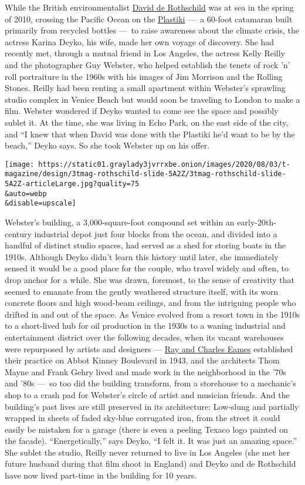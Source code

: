 While the British environmentalist
\href{https://tmagazine.blogs.nytimes3xbfgragh.onion/2010/03/24/profile-in-style-david-de-rothschild/}{David
de Rothschild} was at sea in the spring of 2010, crossing the Pacific
Ocean on the \href{https://theplastiki.com/}{Plastiki} ---~a 60-foot
catamaran built primarily from recycled bottles ---~to raise awareness
about the climate crisis, the actress Karina Deyko, his wife, made her
own voyage of discovery. She had recently met, through a mutual friend
in Los Angeles, the actress Kelly Reilly and the photographer Guy
Webster, who helped establish the tenets of rock 'n' roll portraiture in
the 1960s with his images of Jim Morrison and the Rolling Stones. Reilly
had been renting a small apartment within Webster's sprawling studio
complex in Venice Beach but would soon be traveling to London to make a
film. Webster wondered if Deyko wanted to come see the space and
possibly sublet it. At the time, she was living in Echo Park, on the
east side of the city, and ``I knew that when David was done with the
Plastiki he'd want to be by the beach,'' Deyko says. So she took Webster
up on his offer.

\texttt{[image: https://static01.graylady3jvrrxbe.onion/images/2020/08/03/t-magazine/design/3tmag-rothschild-slide-5A2Z/3tmag-rothschild-slide-5A2Z-articleLarge.jpg?quality=75\\\&auto=webp\\\&disable=upscale]}

Webster's building, a 3,000-square-foot compound set within an
early-20th-century industrial depot just four blocks from the ocean, and
divided into a handful of distinct studio spaces, had served as a shed
for storing boats in the 1910s. Although Deyko didn't learn this history
until later, she immediately sensed it would be a good place for the
couple, who travel widely and often, to drop anchor for a while. She was
drawn, foremost, to the sense of creativity that seemed to emanate from
the gently weathered structure itself, with its worn concrete floors and
high wood-beam ceilings, and from the intriguing people who drifted in
and out of the space. As Venice evolved from a resort town in the 1910s
to a short-lived hub for oil production in the 1930s to a waning
industrial and entertainment district over the following decades, when
its vacant warehouses were repurposed by artists and designers ---
\href{https://www.nytimes3xbfgragh.onion/2020/05/15/arts/ray-charles-eames-artists.html}{Ray
and Charles Eames} established their practice on Abbot Kinney Boulevard
in 1943, and the architects Thom Mayne and Frank Gehry lived and made
work in the neighborhood in the '70s and '80s ---~so too did the
building transform, from a storehouse to a mechanic's shop to a crash
pad for Webster's circle of artist and musician friends. And the
building's past lives are still preserved in its architecture: Low-slung
and partially wrapped in sheets of faded sky-blue corrugated iron, from
the street it could easily be mistaken for a garage (there is even a
peeling Texaco logo painted on the facade). ``Energetically,'' says
Deyko, ``I felt it. It was just an amazing space.'' She sublet the
studio, Reilly never returned to live in Los Angeles (she met her future
husband during that film shoot in England) and Deyko and de Rothschild
have now lived part-time in the building for 10 years.

